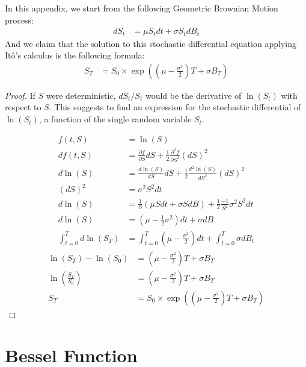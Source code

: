 \documentclass[12pt,twoside]{reedthesis}
\theoremstyle{definition}
\theoremstyle{definition}
\theoremstyle{remark}
\begin{document}
  In this appendix, we start from the following Geometric Brownian Motion
  process:
  \begin{align*}
  dS_t &= \mu S_t dt + \sigma S_t dB_t
  \end{align*}
  And we claim that the solution to this stochastic differential equation
  applying Itô's calculus is the following formula:
  \begin{align*}
  S_T &= S_0 \times \exp \left( \left( \mu  - \frac{\sigma^2}{2} \right) T  + \sigma B_T \right)
  \end{align*}
  \begin{proof}
  
  If $S$ were deterministic, $dS_t/S_t$ would be the derivative of $\ln(S_t)$ with respect to $S$. This suggests to find an expression for the stochastic differential of $\ln(S_t)$, a function of the single random variable $S_t$.
  
  
  \begin{align*} 
  f(t,S) &= \ln(S) \\[10pt]
  df(t,S) &= \frac{\partial f}{\partial S} dS + \frac{1}{2} \frac{\partial^2 f}{\partial S^2} (dS)^2 \\[10pt]
  d\ln(S) &= \frac{d\ln(S)}{dS} dS + \frac{1}{2} \frac{d^2\ln(S)}{dS^2}(dS)^2 \\[10pt]
  (dS)^2 &= \sigma^2 S^2 dt \\[10pt]
  d\ln(S) &= \frac{1}{S} (\mu S dt + \sigma S dB) + \frac{1}{2}\frac{-1}{S^2} \sigma^2 S^2 dt \\[10pt]
  d\ln(S) &= \left( \mu -  \frac{1}{2} \sigma^2 \right) dt + \sigma dB \\[10pt]
  \int_{t=0}^{T}{d\ln(S_T)} &= \int_{t=0}^{T}{\left( \mu - \frac{\sigma^2}{2} \right) dt} + \int_{t=0}^{T}{\sigma dB_t} 
  \end{align*}
  \begin{align*} 
  \ln(S_T) - \ln(S_0) &=  \left(\mu  - \frac{\sigma^2}{2} \right)  T + \sigma B_T \\[10pt]
  \ln \left( \frac{S_T}{S_0} \right) &= \left( \mu  - \frac{\sigma^2}{2}  \right) T + \sigma B_T \\[10pt]
  S_T &= S_0 \times \exp \left( \left( \mu  - \frac{\sigma^2}{2} \right) T  + \sigma B_T \right) 
  \end{align*}
  \end{proof}
  \chapter{Bessel Function}\label{bessel}
  
\end{document}
